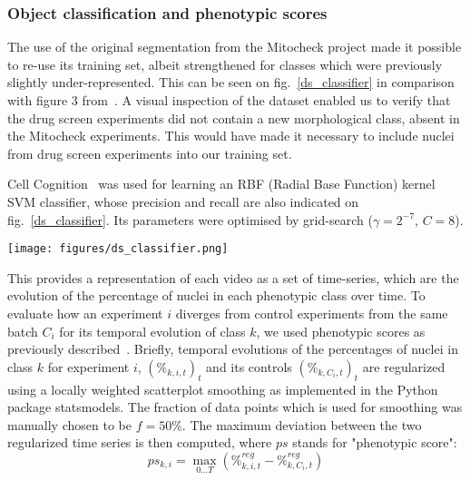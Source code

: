 \subsubsection{Object classification and phenotypic scores}
\label{sec:ps}
The use of the original segmentation from the Mitocheck project made
it possible to re-use its training set, albeit strengthened for
classes which were previously slightly under-represented. This can be
seen on fig.~\ref{ds_classifier} in comparison with figure 3
from~\cite{Walter2010}. A visual inspection of the dataset enabled us
to verify that the drug screen experiments did not contain a new
morphological class, absent in the Mitocheck experiments.
This would have made it necessary to include nuclei from
drug screen experiments into our training set. 

Cell Cognition~\cite{cellcognition} was used for learning an RBF (Radial Base Function) kernel SVM classifier, whose precision and recall are also indicated on fig.~\ref{ds_classifier}. Its parameters were optimised by grid-search ($\gamma=2^{-7}$, $C=8$).

\begin{figure*}[ht!]
\centerline{\texttt{[image: figures/ds\_classifier.png]}}
\caption{Precision and recall per class as provided by Cell Cognition. Compared with the original classifier as published in~\cite{Walter2010}, classes \textit{ADCCM} (Asymmetric Distribution of Condensed Chromosome Masses) and \textit{Out of focus} were added. More nuclei were furthermore included for training in most classes. \textit{Shape1} (resp. \textit{Shape3}, \textit{MetaphaseAlignement}) corresponds to binucleated (resp. polylobed, metaphase alignement problem) nuclei.}
\label{ds_classifier}
\end{figure*}

This provides a representation of each video as a set of time-series, which are the evolution of the percentage of nuclei in each phenotypic class over time. To evaluate how an experiment $i$ diverges from  control experiments from the same batch $C_i$ for its temporal evolution of class $k$, we used phenotypic scores as previously described~\cite{Walter2010}. Briefly, temporal evolutions of the percentages of nuclei in class $k$ for experiment $i$, $(\%_{k,i,t})_t$ and its controls $(\%_{k,C_i,t})_t$ are regularized using a locally weighted scatterplot smoothing as implemented in the Python package statsmodels. The fraction of data points which is used for smoothing was manually chosen to be $f=50\%$. The maximum deviation between the two regularized time series is then computed, where $ps$ stands for "phenotypic score":
\[
ps_{k,i} = \max_{0\ldots T} (\%^{reg}_{k,i,t} - \%^{reg}_{k,C_i,t})
\]

